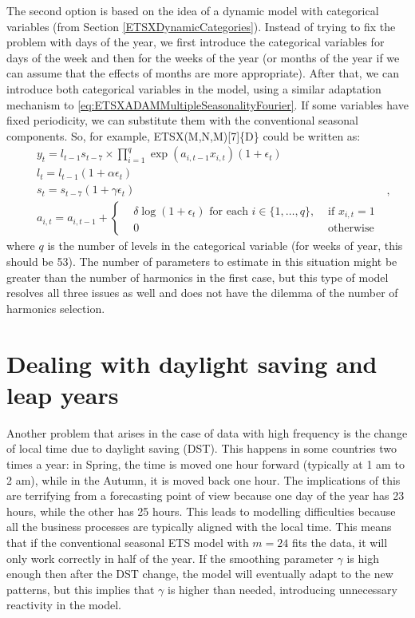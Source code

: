 \documentclass[
]{book}
\theoremstyle{definition}
\theoremstyle{definition}
\theoremstyle{definition}
\theoremstyle{definition}
\theoremstyle{remark}
\begin{document}
The second option is based on the idea of a dynamic model with categorical variables (from Section \ref{ETSXDynamicCategories}). Instead of trying to fix the problem with days of the year, we first introduce the categorical variables for days of the week and then for the weeks of the year (or months of the year if we can assume that the effects of months are more appropriate). After that, we can introduce both categorical variables in the model, using a similar adaptation mechanism to \eqref{eq:ETSXADAMMultipleSeasonalityFourier}. If some variables have fixed periodicity, we can substitute them with the conventional seasonal components. So, for example, ETSX(M,N,M){[}7{]}\{D\} could be written as:
\begin{equation}
  \begin{aligned}
    & {y}_{t} = l_{t-1} s_{t-7} \times \prod_{i=1}^q \exp(a_{i,t-1} x_{i,t}) (1 + \epsilon_t) \\
    & l_t = l_{t-1} (1 + \alpha\epsilon_t) \\
    & s_t = s_{t-7} (1 + \gamma\epsilon_t) \\
    & a_{i,t} = a_{i,t-1} + \left \lbrace \begin{aligned}
      &\delta \log(1+\epsilon_t) \text{ for each } i \in \{1, \dots, q\}, &\text{ if } x_{i,t} = 1 \\
      &0 &\text{ otherwise }
    \end{aligned} \right.
  \end{aligned},
\label{eq:ETSXADAMMultipleSeasonalityCategories}
\end{equation}
where \(q\) is the number of levels in the categorical variable (for weeks of year, this should be 53). The number of parameters to estimate in this situation might be greater than the number of harmonics in the first case, but this type of model resolves all three issues as well and does not have the dilemma of the number of harmonics selection.

\hypertarget{MultipleFrequenciesDSTandLeap}{%
\section{Dealing with daylight saving and leap years}\label{MultipleFrequenciesDSTandLeap}}

Another problem that arises in the case of data with high frequency is the change of local time due to daylight saving (DST). This happens in some countries two times a year: in Spring, the time is moved one hour forward (typically at 1 am to 2 am), while in the Autumn, it is moved back one hour. The implications of this are terrifying from a forecasting point of view because one day of the year has 23 hours, while the other has 25 hours. This leads to modelling difficulties because all the business processes are typically aligned with the local time. This means that if the conventional seasonal ETS model with \(m=24\) fits the data, it will only work correctly in half of the year. If the smoothing parameter \(\gamma\) is high enough then after the DST change, the model will eventually adapt to the new patterns, but this implies that \(\gamma\) is higher than needed, introducing unnecessary reactivity in the model.
\end{document}
